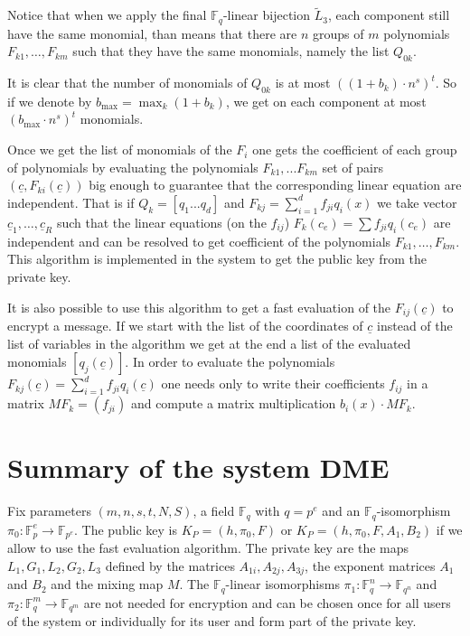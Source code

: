 \documentclass[12pt,a4paper]{amsart}
\theoremstyle{remark}
\theoremstyle{definition}
\newcommand\gfq{\mathbb{F}_q}
\begin{document}
Notice that when we apply the final $\gfq$-linear bijection $\tilde{L}_3$,
each component still have the same monomial, than means that there are $n$ groups
of $m$ polynomials $F_{k1},\dots,F_{km}$ such that they have the same monomials,
namely the list $Q_{0k}$.

It is clear that the number of monomials of $Q_{0k}$ is at most $((1+b_k)\cdot n^s)^t$.
So if we denote by $b_{\max}=\max_k(1+b_k)$, we get on each component
at most $(b_{\max}\cdot n^s)^t$ monomials.




Once we get the list of monomials of the $F_i$
one gets the coefficient of each group of polynomials by evaluating the polynomials
$F_{k1},...F_{km}$ set of pairs $(\underline{c},F_{ki}(\underline{c}))$
big enough to guarantee that the corresponding linear equation are independent. 
That is if $Q_k=[q_1...q_d]$ and $F_{kj}=\sum_{i=1}^d f_{ji} q_i(x)$ 
we take vector $\underline{c}_1,\dots,\underline{c}_R$ such that the linear equations (on the $f_{ij}$)
$F_k(c_e )=\sum f_{ji} q_i(c_e )$
 are independent and can be resolved to get coefficient of the polynomials 
 $F_{k1},\dots,F_{km}$.
This algorithm is implemented in the system to get the public key from the private key.
 
It is also possible to use this algorithm to get a fast evaluation of the $F_{ij}(\underline{c})$ to  encrypt a  message. 
If we  start with the list of the coordinates of $\underline{c}$ instead of the list of variables in the algorithm we get at the end a list of the evaluated monomials $[q_j(\underline{c})]$. In order to   evaluate the polynomials 
$F_{kj}(\underline{c})=\sum_{i=1}^d f_{ji} q_i(\underline{c})$
one needs only to write their coefficients   $f_{ij}$  in a matrix $MF_k=(f_{ji})$ and compute a matrix multiplication $b_i(x)\cdot MF_k$.

\section*{Summary  of the system DME}
Fix parameters $(m,n,s,t,N,S)$, a field $\gfq$ with $q=p^e$ and an $\mathbb{F}_q$-isomorphism 
$\pi_0:\mathbb{F}_p^e \to\mathbb{F}_{p^e }$.
The public key is $K_P=(h,\pi_0,F)$ or  $K_P=(h,\pi_0,F,A_1,B_2)$ if we allow to use the fast evaluation algorithm.
The private key are the maps $L_1,G_1,L_2,G_2,L_3$ defined by the matrices 
$A_{1i},A_{2j},A_{3j}$, the exponent matrices
$A_1$ and $B_2$ and the mixing map $M$. 
The $\mathbb{F}_q$-linear isomorphisms $\pi_1:\mathbb{F}_q^n\to\mathbb{F}_{q^n}$
and $\pi_2:\mathbb{F}_q^m\to\mathbb{F}_{q^m}$
are not needed for encryption and can be chosen once for all users of the system or individually for its user and  form part of the private key.
\end{document}
